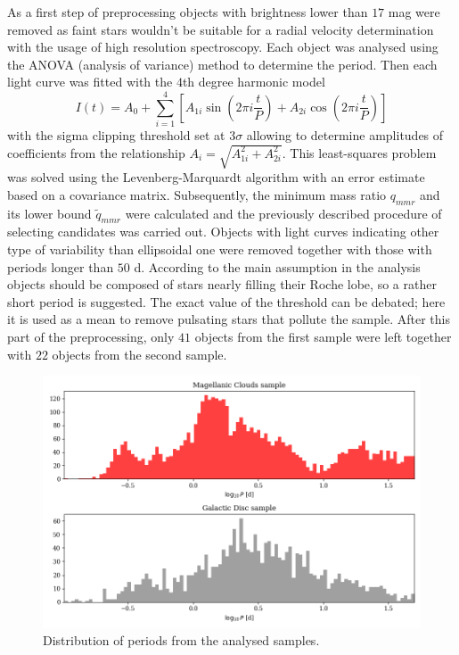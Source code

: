\documentclass{pracalicmgr}
\begin{document}
As a first step of preprocessing objects with brightness lower than
$17$ mag  were removed as faint stars wouldn't be suitable for a radial velocity determination with the usage of high resolution spectroscopy.
Each object was analysed using the ANOVA (analysis of variance) method \citep{schwarzenberg-czerny_advantage_1989} to determine the period.
Then each light curve was fitted with the $4$th degree harmonic model
\begin{equation}\label{harm}
    I(t)=A_0+\sum_{i=1}^4\left[ A_{1i}\sin{\left(2\pi i\frac{t}{P}\right)}+A_{2i}\cos{\left(2\pi i\frac{t}{P}\right)}\right]
\end{equation}
with the sigma clipping threshold set at $3\sigma$ allowing to determine amplitudes of coefficients from the relationship $A_i=\sqrt{A_{1i}^2+A_{2i}^2}$.
This least-squares problem was solved using the Levenberg-Marquardt algorithm with an error estimate based on a covariance matrix.
Subsequently, the minimum mass ratio $q_{mmr}$ and its lower bound $\tilde{q}_{mmr}$ were calculated and the previously described procedure of selecting candidates was carried out.
Objects with light curves indicating other type of variability than ellipsoidal one were removed together with those with periods longer than
$50$ d. According to the main assumption in the analysis objects should be composed of stars nearly filling their Roche lobe, so a rather short period is suggested. The exact value of the threshold can be debated; here it is used as a mean to
remove pulsating stars that pollute the sample. After this part of the preprocessing, only $41$ objects from the first sample were left together with $22$ objects from the second sample.
\begin{figure}
    \includegraphics[scale=0.5]{plots/periods.png}
    \caption{Distribution of periods from the analysed samples.}
    \label{periods}
\end{figure}
\end{document}
